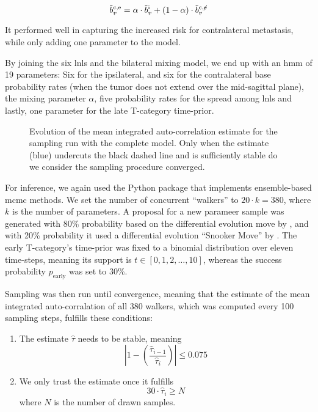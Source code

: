 \documentclass[\relativeRoot/main.tex]{subfiles}
\begin{document}
\begin{equation}
    \tilde{b}_v^\text{c,e} = \alpha \cdot \tilde{b}_v^\text{i} + (1 - \alpha) \cdot \tilde{b}_v^{\text{c},\centernot{\text{e}}}
\end{equation}

It performed well in capturing the increased risk for contralateral metastasis, while only adding one parameter to the model.

By joining the six \glspl{lnl} and the bilateral mixing model, we end up with an \gls{hmm} of 19 parameters: Six for the ipsilateral, and six for the contralateral base probability rates (when the tumor does not extend over the mid-sagittal plane), the mixing parameter $\alpha$, five probability rates for the spread among \glspl{lnl} and lastly, one parameter for the late T-category time-prior.

\begin{figure}
    \centering
    \def\svgwidth{0.7\textwidth}
    
    \caption[
        Mean integrated auto-correlation estimate for the complete model's run
    ]{
        Evolution of the mean integrated auto-correlation estimate for the sampling run with the complete model. Only when the estimate (blue) undercuts the black dashed line and is sufficiently stable do we consider the sampling procedure converged.
    }
    \label{fig:complete:acor}
\end{figure}

For inference, we again used the  Python package that implements ensemble-based \gls{mcmc} methods. We set the number of concurrent ``walkers'' to $20 \cdot k = 380$, where $k$ is the number of parameters. A proposal for a new parameer sample was generated with 80\% probability based on the differential evolution move by , and with 20\% probability it used a differential evolution ``Snooker Move'' by . The early T-category's time-prior was fixed to a binomial distribution over eleven time-steps, meaning its support is $t \in \left[0, 1, 2, \ldots, 10\right]$, whereas the success probability $p_\text{early}$ was set to 30\%.

Sampling was then run until convergence, meaning that the estimate of the mean integrated auto-corralation of all 380 walkers, which was computed every 100 sampling steps, fulfills these conditions:

\begin{enumerate}[label={(\arabic*)}]
    \item The estimate $\hat{\tau}$ needs to be stable, meaning
    \begin{equation}
        \left| 1 - \left( \frac{\hat{\tau}_{i-1}}{\hat{\tau}_i} \right) \right| \leq 0.075
    \end{equation}
    \item We only trust the estimate once it fulfills
    \begin{equation}
        30 \cdot \hat{\tau}_i \geq N
    \end{equation}
    where $N$ is the number of drawn samples.
\end{enumerate}
\end{document}
